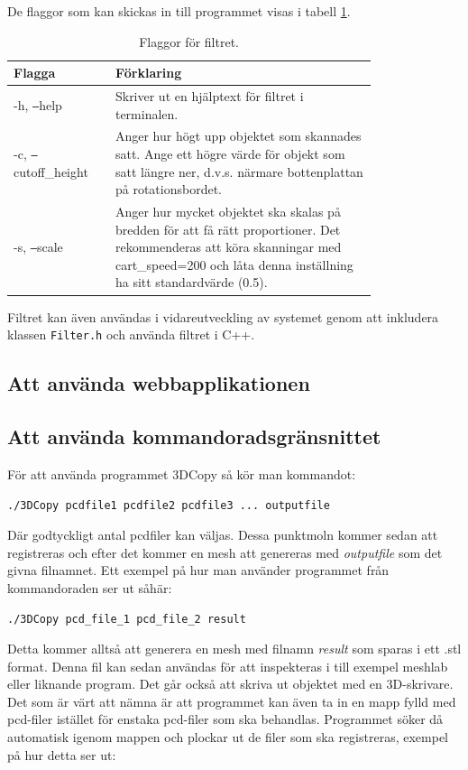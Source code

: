 \documentclass[a4paper,titlepage,12pt]{article}
\begin{document}
	De flaggor som kan skickas in till programmet visas i tabell \ref{tab:filter_flaggor}.
	
	\begin{table}[h!]
		\centering
		\caption{Flaggor för filtret.}
		\label{tab:filter_flaggor}
		
		\begin{tabular}{p{0.2\linewidth}p{0.6\linewidth}}
			Flagga & Förklaring \\
			\hline
			-h, \texttt{--}help & Skriver ut en hjälptext för filtret i terminalen. \\
			\hline
			-c, \texttt{--}cutoff\_height & Anger hur högt upp objektet som skannades satt. Ange ett högre värde för objekt som satt längre ner, d.v.s. närmare bottenplattan på rotationsbordet. \\
			\hline
			-s, \texttt{--}scale & Anger hur mycket objektet ska skalas på bredden för att få rätt proportioner. Det rekommenderas att köra skanningar med cart\_speed=200 och låta denna inställning ha sitt standardvärde (0.5). \\
			\hline
		\end{tabular}
	
	\end{table}

	Filtret kan även användas i vidareutveckling av systemet genom att inkludera klassen \texttt{Filter.h} och använda filtret i C++.
	
	\subsection{Att använda webbapplikationen}
	
	\subsection{Att använda kommandoradsgränsnittet}
		För att använda programmet 3DCopy så kör man kommandot:
		
		\texttt{./3DCopy pcdfile1 pcdfile2 pcdfile3 ... outputfile}
		
		Där godtyckligt antal pcdfiler kan väljas. Dessa punktmoln kommer sedan att registreras och efter det kommer en mesh att genereras med \textit{outputfile} som det givna filnamnet. Ett exempel på hur man använder programmet från kommandoraden ser ut såhär:
		
		\texttt{./3DCopy pcd\_file\_1 pcd\_file\_2 result}
		
		Detta kommer alltså att generera en mesh med filnamn \textit{result} som sparas i ett .stl format. Denna fil kan sedan användas för att inspekteras i till exempel meshlab eller liknande program. Det går också att skriva ut objektet med en 3D-skrivare. Det som är värt att nämna är att programmet kan även ta in en mapp fylld med pcd-filer istället för enstaka pcd-filer som ska behandlas. Programmet söker då automatisk igenom mappen och plockar ut de filer som ska registreras, exempel på hur detta ser ut:
		
\end{document}
